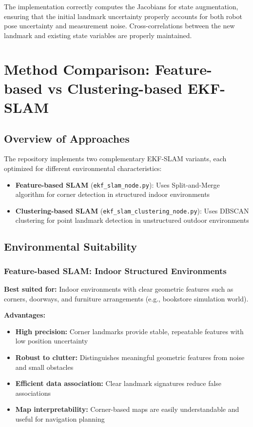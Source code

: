 \documentclass[12pt,a4paper]{article}
\begin{document}
The implementation correctly computes the Jacobians for state augmentation, ensuring that the initial landmark uncertainty properly accounts for both robot pose uncertainty and measurement noise. Cross-correlations between the new landmark and existing state variables are properly maintained.

\section{Method Comparison: Feature-based vs Clustering-based EKF-SLAM}

\subsection{Overview of Approaches}

The repository implements two complementary EKF-SLAM variants, each optimized for different environmental characteristics:

\begin{itemize}
    \item \textbf{Feature-based SLAM} (\texttt{ekf\_slam\_node.py}): Uses Split-and-Merge algorithm for corner detection in structured indoor environments
    \item \textbf{Clustering-based SLAM} (\texttt{ekf\_slam\_clustering\_node.py}): Uses DBSCAN clustering for point landmark detection in unstructured outdoor environments
\end{itemize}

\subsection{Environmental Suitability}

\subsubsection{Feature-based SLAM: Indoor Structured Environments}

\textbf{Best suited for:} Indoor environments with clear geometric features such as corners, doorways, and furniture arrangements (e.g., bookstore simulation world).

\textbf{Advantages:}
\begin{itemize}
    \item \textbf{High precision:} Corner landmarks provide stable, repeatable features with low position uncertainty
    \item \textbf{Robust to clutter:} Distinguishes meaningful geometric features from noise and small obstacles
    \item \textbf{Efficient data association:} Clear landmark signatures reduce false associations
    \item \textbf{Map interpretability:} Corner-based maps are easily understandable and useful for navigation planning
\end{itemize}
\end{document}
